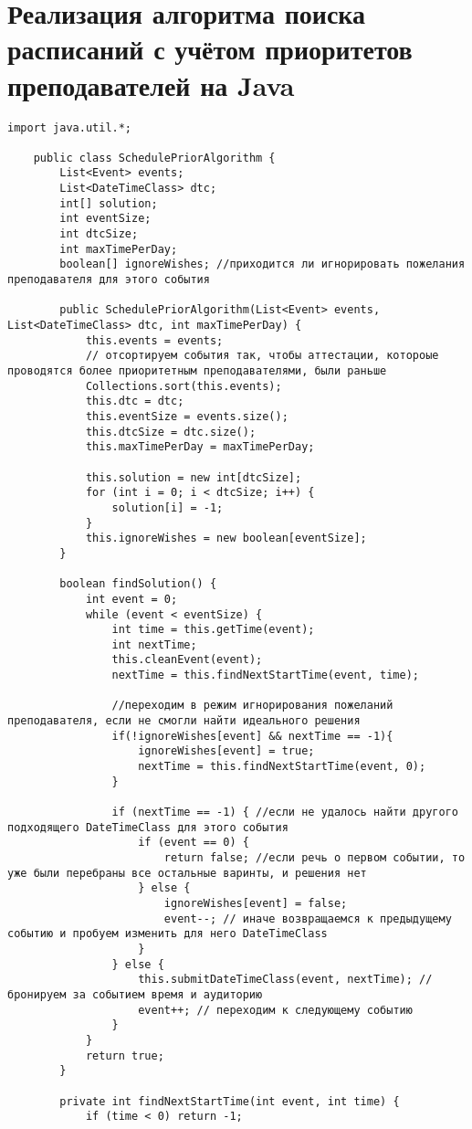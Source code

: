 \chapter{Реализация алгоритма поиска расписаний с учётом приоритетов преподавателей на Java}\label{appendix-source}	

\begin{lstlisting}
import java.util.*;
	
	public class SchedulePriorAlgorithm {
		List<Event> events;
		List<DateTimeClass> dtc;
		int[] solution;
		int eventSize;
		int dtcSize;
		int maxTimePerDay;
		boolean[] ignoreWishes; //приходится ли игнорировать пожелания преподавателя для этого события
		
		public SchedulePriorAlgorithm(List<Event> events, List<DateTimeClass> dtc, int maxTimePerDay) {
			this.events = events;
			// отсортируем события так, чтобы аттестации, котороые проводятся более приоритетным преподавателями, были раньше
			Collections.sort(this.events);
			this.dtc = dtc;
			this.eventSize = events.size();
			this.dtcSize = dtc.size();
			this.maxTimePerDay = maxTimePerDay;
			
			this.solution = new int[dtcSize];
			for (int i = 0; i < dtcSize; i++) {
				solution[i] = -1;
			}
			this.ignoreWishes = new boolean[eventSize];
		}
		
		boolean findSolution() {
			int event = 0;
			while (event < eventSize) {
				int time = this.getTime(event);
				int nextTime;
				this.cleanEvent(event);
				nextTime = this.findNextStartTime(event, time);
				
				//переходим в режим игнорирования пожеланий преподавателя, если не смогли найти идеального решения
				if(!ignoreWishes[event] && nextTime == -1){
					ignoreWishes[event] = true;
					nextTime = this.findNextStartTime(event, 0);
				}
				
				if (nextTime == -1) { //если не удалось найти другого подходящего DateTimeClass для этого события
					if (event == 0) {
						return false; //если речь о первом событии, то уже были перебраны все остальные варинты, и решения нет
					} else {
						ignoreWishes[event] = false;
						event--; // иначе возвращаемся к предыдущему событию и пробуем изменить для него DateTimeClass
					}
				} else {
					this.submitDateTimeClass(event, nextTime); //бронируем за событием время и аудиторию
					event++; // переходим к следующему событию
				}
			}
			return true;
		}
		
		private int findNextStartTime(int event, int time) {
			if (time < 0) return -1;
			

\end{lstlisting}
